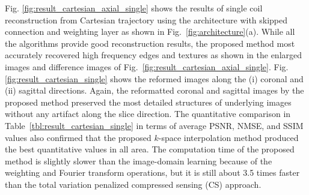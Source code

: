 \documentclass[10pt,journal]{IEEEtran}
\newcommand{\0}{{\boldsymbol{0}}}
\begin{document}
\begin{table*}[!t]
\centering
{}
\caption{Quantitative comparison from Cartesian trajectory at $R=3$ in 8 coils parallel imaging. }
\label{tbl:result_cartesian_multi}
\end{table*}

 Fig. \ref{fig:result_cartesian_axial_single} shows the results of single coil reconstruction from Cartesian trajectory using the architecture with skipped connection and weighting layer as shown in Fig.~\ref{fig:architecture}(a).
 While all the algorithms provide good reconstruction results, the proposed method most accurately
recovered  high frequency edges and textures 
as shown in the enlarged images and difference images of Fig.~\ref{fig:result_cartesian_axial_single}.
Fig. \ref{fig:result_cartesian_single} shows the reformed images along the (i) coronal and (ii) sagittal directions. Again, the reformatted coronal and sagittal images by the proposed method
preserved the most detailed structures of underlying images without any artifact along the slice direction. 
 The quantitative comparison in Table~\ref{tbl:result_cartesian_single} in terms of   average PSNR, NMSE, and SSIM values also confirmed that
the proposed $k$-space interpolation method produced the best quantitative values in all area. The computation time of the
proposed method is slightly slower than the image-domain learning because of the weighting and Fourier transform operations,
but it is still about 3.5 times faster than the total variation penalized compressed sensing (CS) approach.
\end{document}
